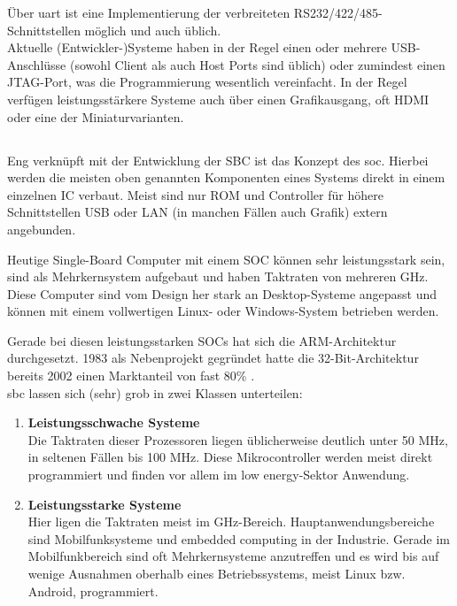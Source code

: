 \documentclass[thesis.tex]{subfiles}
\begin{document}
Über \gls{uart} ist eine Implementierung der verbreiteten RS232/422/485-Schnittstellen möglich und auch üblich.\\

Aktuelle (Entwickler-)Systeme haben in der Regel einen oder mehrere USB-Anschlüsse (sowohl Client als auch Host Ports sind üblich) oder zumindest einen JTAG-Port, was die Programmierung wesentlich vereinfacht. In der Regel verfügen leistungsstärkere Systeme auch über einen Grafikausgang, oft HDMI oder eine der Miniaturvarianten.


\subsection{}
Eng verknüpft mit der Entwicklung der SBC ist das Konzept des \gls{soc}. Hierbei werden die meisten oben genannten Komponenten eines Systems direkt in einem einzelnen IC verbaut. Meist sind nur ROM und Controller für höhere Schnittstellen USB oder LAN (in manchen Fällen auch Grafik) extern angebunden.

Heutige Single-Board Computer mit einem SOC können sehr leistungsstark sein, sind als Mehrkernsystem aufgebaut und haben Taktraten von mehreren GHz. Diese Computer sind vom Design her stark an Desktop-Systeme angepasst und können mit einem vollwertigen Linux- oder Windows-System betrieben werden.

Gerade bei diesen leistungsstarken SOCs hat sich die ARM-Architektur durchgesetzt. 1983 als Nebenprojekt gegründet hatte die 32-Bit-Architektur bereits 2002 einen Marktanteil von fast 80\% \cite{stiller2002}.\\

\noindent \gls{sbc} lassen sich (sehr) grob in zwei Klassen unterteilen:

\begin{enumerate}
\item \textbf{Leistungsschwache Systeme}\\
Die Taktraten dieser Prozessoren liegen üblicherweise deutlich unter 50 MHz, in seltenen Fällen bis 100 MHz. Diese Mikrocontroller werden meist direkt programmiert und finden vor allem im low energy-Sektor Anwendung.
\item \textbf{Leistungsstarke Systeme}\\
Hier ligen die Taktraten meist im GHz-Bereich. Hauptanwendungsbereiche sind Mobilfunksysteme und embedded computing in der Industrie. Gerade im Mobilfunkbereich sind oft Mehrkernsysteme anzutreffen und es wird bis auf wenige Ausnahmen oberhalb eines Betriebssystems, meist Linux bzw. Android, programmiert.
\end{enumerate}
\end{document}
